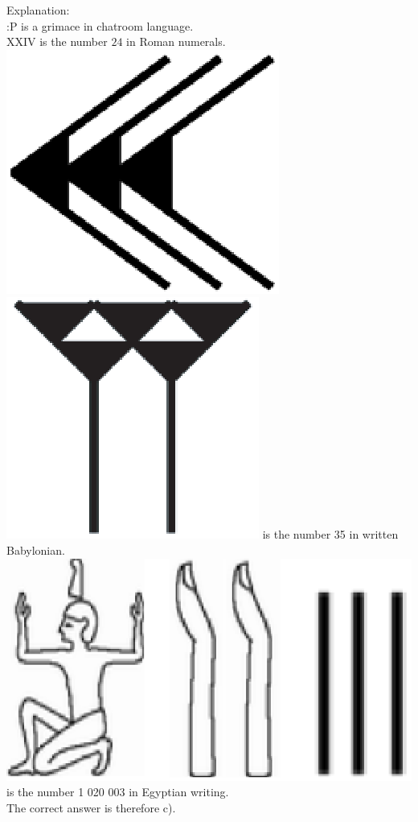 \documentclass[letterpaper, 12pt]{article}
\begin{document}
Explanation:\\
:\textsf{P} is a grimace in chatroom language.\\
XXIV is the number $24$ in Roman numerals.\\
\includegraphics[scale=0.1]{30.eps} \includegraphics[scale=0.1]{5.eps} is the number 35 in written Babylonian.\\
\includegraphics[scale=0.12]{nombregyptien.eps} is the number 1 020 003 in Egyptian writing.\\
The correct answer is therefore c).\\
\end{document}
